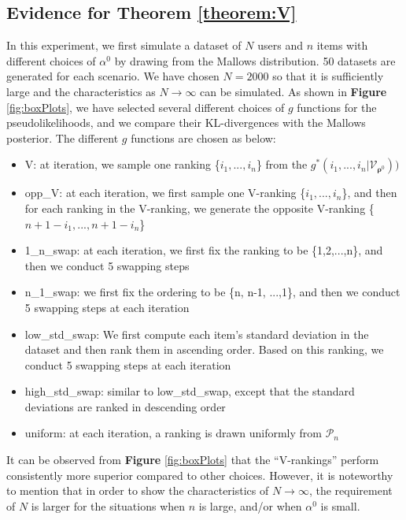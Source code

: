 \documentclass[11pt, oneside]{article}   	%
\begin{document}
\subsection{Evidence for Theorem \ref{theorem:V}}
In this experiment, we first simulate a dataset of $N$ users and $n$ items with different choices of $\alpha^0$ by drawing from the Mallows distribution.  50 datasets are generated for each scenario. We have chosen $N = 2000$ so that it is sufficiently large and the characteristics as $N \rightarrow \infty$ can be simulated. As shown in \textbf{Figure} \ref{fig:boxPlots}, we have selected several different choices of $g$ functions for the pseudolikelihoods, and we compare their KL-divergences with the Mallows posterior. The different $g$ functions are chosen as below:
\begin{itemize}
	\item {V: at iteration, we sample one ranking \{$i_1, ...,i_n$\} from the $g^*(i_1, ..., i_n | \mathcal{V}_{\bm{\rho}^0}))$}
	\item {opp\_V: at each iteration, we first sample one V-ranking \{$i_1, ...,i_n$\}, and then for each ranking in the V-ranking, we generate the opposite V-ranking \{$n+1 - i_1, ..., n+1 - i_n$\}}
	\item {1\_n\_swap: at each iteration, we first fix the ranking to be \{1,2,...,n\}, and then we conduct 5 swapping steps}
	\item {n\_1\_swap: we first fix the ordering to be \{n, n-1, ...,1\}, and then we conduct 5 swapping steps at each iteration}
	\item {low\_std\_swap: We first compute each item's standard deviation in the dataset and then rank them in ascending order. Based on this ranking, we conduct 5 swapping steps at each iteration}
	\item {high\_std\_swap: similar to low\_std\_swap, except that the standard deviations are ranked in descending order}
	\item{uniform: at each iteration, a ranking is drawn uniformly from $\mathcal{P}_n$}
\end{itemize}

It can be observed from \textbf{Figure} \ref{fig:boxPlots} that the ``V-rankings'' perform consistently more superior compared to other choices. However, it is noteworthy to mention that in order to show the characteristics of $N \rightarrow \infty$, the requirement of $N$ is larger for the situations when $n$ is large, and/or when $\alpha^0$ is small.
\end{document}
